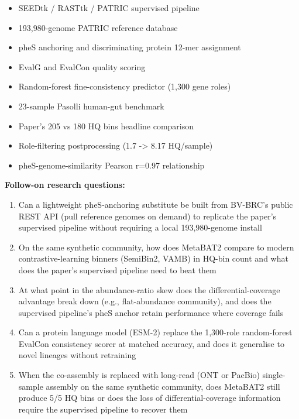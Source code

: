 \begin{itemize}[leftmargin=1.4em,itemsep=0.2em,topsep=0.2em]
\item SEEDtk / RASTtk / PATRIC supervised pipeline
\item 193,980-genome PATRIC reference database
\item pheS anchoring and discriminating protein 12-mer assignment
\item EvalG and EvalCon quality scoring
\item Random-forest fine-consistency predictor (1,300 gene roles)
\item 23-sample Pasolli human-gut benchmark
\item Paper's 205 vs 180 HQ bins headline comparison
\item Role-filtering postprocessing (1.7 -\textgreater{} 8.17 HQ/sample)
\item pheS-genome-similarity Pearson r=0.97 relationship
\end{itemize}\noindent\textbf{Follow-on research questions:}
\begin{enumerate}[leftmargin=1.6em,itemsep=0.2em,topsep=0.2em,label=Q\arabic*.]
\item Can a lightweight pheS-anchoring substitute be built from BV-BRC's public REST API (pull reference genomes on demand) to replicate the paper's supervised pipeline without requiring a local 193,980-genome install
\item On the same synthetic community, how does MetaBAT2 compare to modern contrastive-learning binners (SemiBin2, VAMB) in HQ-bin count and what does the paper's supervised pipeline need to beat them
\item At what point in the abundance-ratio skew does the differential-coverage advantage break down (e.g., flat-abundance community), and does the supervised pipeline's pheS anchor retain performance where coverage fails
\item Can a protein language model (ESM-2) replace the 1,300-role random-forest EvalCon consistency scorer at matched accuracy, and does it generalise to novel lineages without retraining
\item When the co-assembly is replaced with long-read (ONT or PacBio) single-sample assembly on the same synthetic community, does MetaBAT2 still produce 5/5 HQ bins or does the loss of differential-coverage information require the supervised pipeline to recover them
\end{enumerate}

